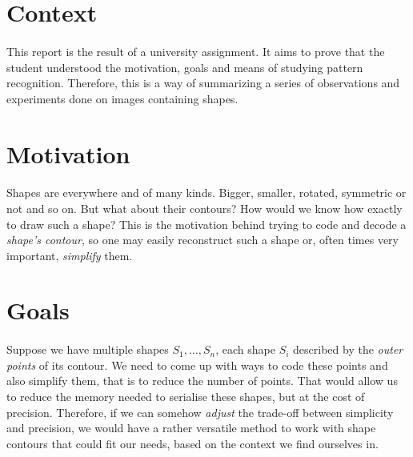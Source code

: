 \section{Context}
\paragraph{}
This report is the result of a university assignment.
It aims to prove that the student understood the motivation, goals and means of studying pattern recognition.
Therefore, this is a way of summarizing a series of observations and experiments done on images containing shapes.

\section{Motivation}
\paragraph{}
Shapes are everywhere and of many kinds. Bigger, smaller, rotated, symmetric or not and so on. But what about their contours?
How would we know how exactly to draw such a shape? This is the motivation behind trying to code and decode a \emph{shape's contour},
so one may easily reconstruct such a shape or, often times very important, \emph{simplify} them.

\section{Goals}
\paragraph{}
Suppose we have multiple shapes $S_1, \dots, S_n$, each shape $S_i$ described by the \emph{outer points} of its contour.
We need to come up with ways to code these points and also simplify them, that is to reduce the number of points.
That would allow us to reduce the memory needed to serialise these shapes, but at the cost of precision.
\label{trade-off}
Therefore, if we can somehow \emph{adjust} the trade-off between simplicity and precision,
we would have a rather versatile method to work with shape contours that could fit our needs, based on the context we find ourselves in.

